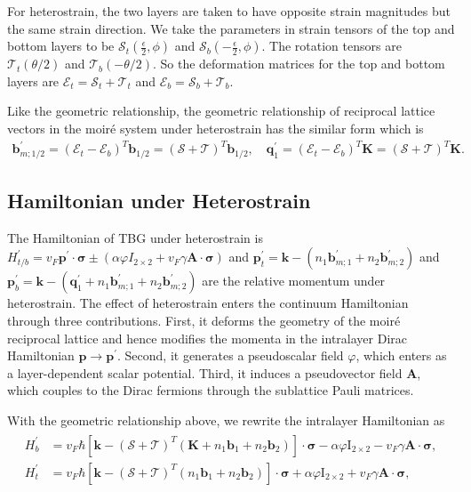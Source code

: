\documentclass[10pt, oneside]{article}
\newcommand{\te}{\theta}
\newcommand{\vph}{\varphi}
\newcommand{\pr}{\prime}
\newcommand{\mr}[1]{\mathrm{#1}}
\newcommand{\p}[1]{\left(#1\right)}
\newcommand{\bb}[1]{\left[#1\right]}
\begin{document}
For heterostrain, the two layers are taken to have opposite strain magnitudes but the same strain direction. We take the parameters in strain tensors of the top and bottom layers to be \(\mathcal{S}_{t}\p{\frac{\epsilon}{2}, \phi}\) and \(\mathcal{S}_{b}\p{-\frac{\epsilon}{2}, \phi}\). The rotation tensors are \(\mathcal{T}_{t} \p{\te/2}\) and \(\mathcal{T}_{b} \p{-\te/2}\). So the deformation matrices for the top and bottom layers are \(\mathcal{E}_{t} = \mathcal{S}_{t} + \mathcal{T}_{t}\) and \(\mathcal{E}_{b} = \mathcal{S}_{b} + \mathcal{T}_{b}\).

Like the geometric relationship, the geometric relationship of reciprocal lattice vectors in the moiré system under heterostrain has the similar form which is 
\begin{align}
	\bm{b}^{\prime}_{m; 1/2} = \p{\mathcal{E}_{t} - \mathcal{E}_{b}}^{T} \bm{b}_{1/2} = \p{\mathcal{S} + \mathcal{T}}^{T} \bm{b}_{1/2},
	\quad
	\bm{q}^{\prime}_{1} = \p{\mathcal{E}_{t} - \mathcal{E}_{b}}^{T} \bm{K} = \p{\mathcal{S} + \mathcal{T}}^{T} \bm{K}.
\end{align}


\subsection{Hamiltonian under Heterostrain}
The Hamiltonian of TBG under heterostrain is \(H^{\pr}_{t/b} = v_F \bm{p}^\pr \cdot \bm{\sigma} \pm \p{\alpha \vph I_{\mr{2 \times 2}} + v_F \gamma \bm{A} \cdot \bm{\sigma}}\) and \(\bm{p}_{t}^\pr = \bm{k} - \p{n_1 \bm{b}^{\pr}_{m;1} + n_2 \bm{b}^{\pr}_{m;2}}\) and \(\bm{p}_{b}^\pr = \bm{k} - \p{\bm{q}^{\prime}_{1} + n_1 \bm{b}^{\pr}_{m;1} + n_2 \bm{b}^{\pr}_{m;2}}\) are the relative momentum under heterostrain. The effect of heterostrain enters the continuum Hamiltonian through three contributions. First, it deforms the geometry of the moir\'e reciprocal lattice and hence modifies the momenta in the intralayer Dirac Hamiltonian \(\bm{p} \rightarrow \bm{p}^\prime\). Second, it generates a pseudoscalar field \(\vph\), which enters as a layer-dependent scalar potential. Third, it induces a pseudovector field \(\bm A\), which couples to the Dirac fermions through the sublattice Pauli matrices.

With the geometric relationship above, we rewrite the intralayer Hamiltonian as
\begin{align}
	\begin{split}
		H^{\pr}_{b} & = v_{F} \hbar \bb{\bm{k} -  \p{\mathcal{S} + \mathcal{T}}^{T} \p{\bm{K} + n_1 \bm{b}_{1} + n_2 \bm{b}_{2}} } \cdot \bm{\sigma} - \alpha \vph \mr{I}_{2 \times 2} - v_F \gamma \bm{A} \cdot \bm{\sigma}, \\
		H^{\pr}_{t} & = v_{F} \hbar \bb{\bm{k} -  \p{\mathcal{S} + \mathcal{T}}^{T} \p{n_1 \bm{b}_{1} + n_2 \bm{b}_{2}} } \cdot \bm{\sigma} + \alpha \vph \mr{I}_{2\times2} + v_F \gamma \bm{A} \cdot \bm{\sigma},
	\end{split}
\end{align}
\end{document}
